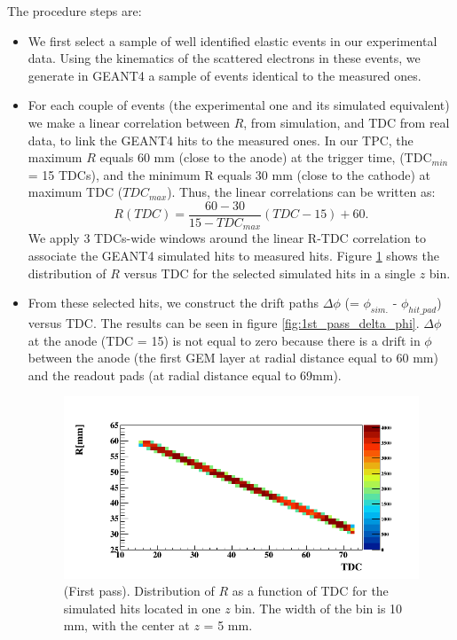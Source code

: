 The procedure steps are:
\begin{itemize}
\item We first select a sample of well identified elastic events in our experimental data. Using the
   kinematics of the scattered electrons in these events, we generate in GEANT4
   a sample of events identical to the measured ones. 
\item  For each couple of events (the experimental one and its simulated equivalent)
   we make a linear correlation between $R$, from simulation, and TDC from 
   real data, to link the GEANT4 hits to the measured ones. In our TPC, the 
   maximum $R$ equals 60 mm (close to the anode) at the trigger time, 
   (TDC$_{min}$ = 15 TDCs), and the minimum R equals 30 mm (close to the 
   cathode) at maximum TDC ($TDC_{max}$). Thus, the linear correlations can be 
   written as:
\begin{equation}
   R(TDC) = \frac{60-30}{15-TDC_{max}} (TDC-15) + 60.
\label{equ:R_TDC}
\end{equation}
We apply 3 TDCs-wide windows around the linear R-TDC correlation to associate 
the GEANT4 simulated hits to measured hits. Figure \ref{fig:R_correlation} 
shows the distribution of $R$ versus TDC for the selected simulated hits in a 
single $z$ bin.

\item From these selected hits, we construct the drift paths $\Delta \phi$ (= 
   $\phi_{sim.}$ - $\phi_{hit\_pad}$) versus TDC. The results can be seen in 
   figure \ref{fig:1st_pass_delta_phi}. $\Delta \phi$ at the anode (TDC = 15) 
   is not equal to zero because there is a drift in $\phi$ between the anode 
   (the first GEM layer at radial distance equal to 60 mm) and the readout pads 
   (at radial distance equal to 69mm).

\begin{figure}[tpb]
\centering
\includegraphics[scale=0.45]{fig_rtpc/updates/TdcR_check_p1_10.png}
\caption{(First pass). Distribution of $R$ as a function of TDC for the 
simulated hits located in one $z$ bin. The width of the bin is 10 mm, with the 
center at $z$ = 5 mm.}
\label{fig:R_correlation}
\end{figure}


\end{itemize}
